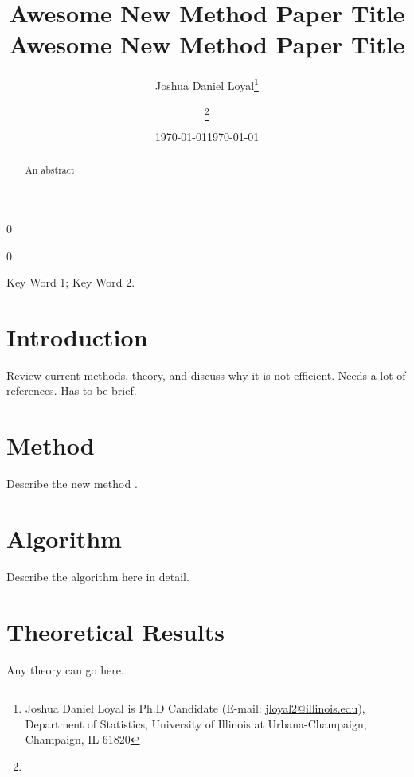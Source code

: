\documentclass[12pt]{article}
\newcommand{\blind}{0}
\begin{document}
\blind
{
\title{ Awesome New Method Paper Title }

\author{
Joshua Daniel Loyal\thanks{Joshua Daniel Loyal is Ph.D Candidate (E-mail: \href{mailto:jloyal2@illinois.edu}{jloyal2@illinois.edu}), Department of Statistics, University of Illinois at Urbana-Champaign, Champaign, IL 61820}
}

\date{\today}
\maketitle
}
\fi
{}\blind
{
\title{ Awesome New Method Paper Title }

\author{\thanks{\vspace{2em}}}

\date{\today}
\maketitle
}\fi

\begin{abstract}
An abstract
\end{abstract}

Key Word 1; Key Word 2.


\section{Introduction} \label{sec:intro}

Review current methods, theory, and discuss why it is not efficient. Needs a lot of references. Has to be brief.

\section{Method} \label{sec:method}

Describe the new method \citep{Li:1991sir}.

\section{Algorithm}\label{sec:alg}

Describe the algorithm here in detail.

\section{Theoretical Results} \label{sec:theory}
Any theory can go here.
\end{document}
